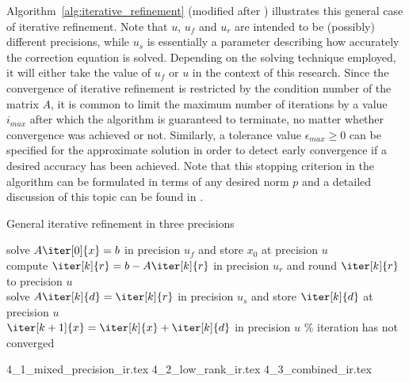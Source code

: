 \noindent Algorithm~\hyperref[alg:iterative_refinement]{\ref{alg:iterative_refinement}} (modified after \cite{carson_new_2017}) illustrates this general case of iterative refinement. Note that $u$, $u_f$ and $u_r$ are intended to be (possibly) different precisions, while $u_s$ is essentially a parameter describing how accurately the correction equation is solved. Depending on the solving technique employed, it will either take the value of $u_f$ or $u$ in the context of this research. Since the convergence of iterative refinement is restricted by the condition number of the matrix $A$, it is common to limit the maximum number of iterations by a value $i_{max}$ after which the algorithm is guaranteed to terminate, no matter whether convergence was achieved or not. Similarly, a tolerance value $\epsilon_{max} \geq 0$ can be specified for the approximate solution in order to detect early convergence if a desired accuracy has been achieved.  Note that this stopping criterion in the algorithm can be formulated in terms of any desired norm $p$ and a detailed discussion of this topic can be found in \cite{demmel_error_2006}.

\begin{algorithm}[h]
  \caption{General iterative refinement in three precisions}
  \label{alg:iterative_refinement}
  \SetAlgoLined
  solve $A\iter[0]{x}=b$ in precision $u_f$ and store $x_0$ at precision $u$ \\
   {
    compute $\iter[k]{r} = b-A\iter[k]{r}$ in precision $u_r$ and round $\iter[k]{r}$ to precision $u$ \\
    solve $A\iter[k]{d}=\iter[k]{r}$ in precision $u_s$ and store $\iter[k]{d}$ at precision $u$ \\
    $\iter[k+1]{x}=\iter[k]{x}+\iter[k]{d}$ in precision $u$}
  \% iteration has not converged
\end{algorithm}

{4_1_mixed_precision_ir.tex}
{4_2_low_rank_ir.tex}
{4_3_combined_ir.tex}
